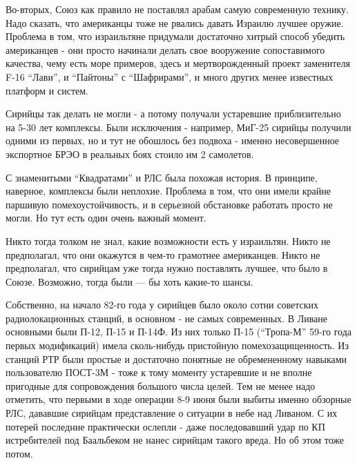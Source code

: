 Во-вторых, Союз как правило не поставлял арабам самую современную технику. Надо сказать, что американцы тоже не рвались давать Израилю лучшее оружие. Проблема в том, что израильтяне придумали достаточно хитрый способ убедить американцев - они просто начинали делать свое вооружение сопоставимого качества, чему есть море примеров, здесь и мертворожденный проект заменителя F-16 “Лави”, и “Пайтоны” с “Шафрирами”, и много других менее известных платформ и систем.

Сирийцы так делать не могли - а потому получали устаревшие приблизительно на 5-30 лет комплексы. Были исключения - например, МиГ-25 сирийцы получили одними из первых, но и тут не обошлось без подвоха - именно несовершенное экспортное БРЭО в реальных боях стоило им 2 самолетов.

С знаменитыми “Квадратами” и РЛС была похожая история. В принципе, наверное, комплексы были неплохие. Проблема в том, что они имели крайне паршивую помехоустойчивость, и в серьезной обстановке работать просто не могли. Но тут есть один очень важный момент.

Никто тогда толком не знал, какие возможности есть у израильтян. Никто не предполагал, что они окажутся в чем-то грамотнее американцев. Никто не предполагал, что сирийцам уже тогда нужно поставлять лучшее, что было в Союзе. Возможно, тогда были — бы хоть какие-то шансы.

Собственно, на начало 82-го года у сирийцев было около сотни советских радиолокационных станций, в основном - не самых современных. В Ливане основными были П-12, П-15 и П-14Ф. Из них только П-15 (“Тропа-М” 59-го года первых модификаций) имела сколь-нибудь пристойную помехозащищенность. Из станций РТР были простые и достаточно понятные не обремененному навыками пользователю ПОСТ-3М - тоже к тому моменту устаревшие и не вполне пригодные для сопровождения большого числа целей. Тем не менее надо отметить, что первыми в ходе операции 8-9 июня были выбиты именно обзорные РЛС, дававшие сирийцам представление о ситуации в небе над Ливаном. С их потерей последние практически ослепли - даже последовавший удар по КП истребителей под Баальбеком не нанес сирийцам такого вреда. Но об этом тоже потом.

